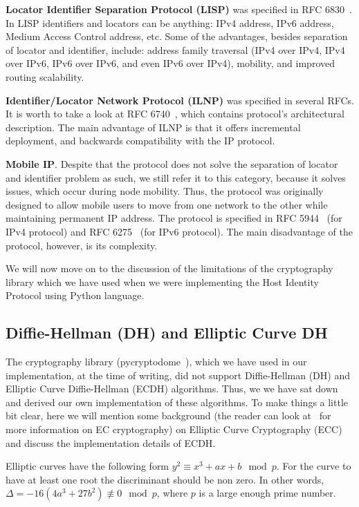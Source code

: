 {\bf Locator Identifier Separation Protocol (LISP)} was specified in RFC 6830~\cite{rfc6830}.
In LISP identifiers and locators can be anything: IPv4 address, IPv6 address, Medium
Access Control address, etc. Some of the advantages, besides separation of locator and
identifier, include: address family traversal (IPv4 over IPv4, IPv4 over IPv6, IPv6 over IPv6,
and even IPv6 over IPv4), mobility, and improved routing scalability.

{\bf Identifier/Locator Network Protocol (ILNP)} was specified in several RFCs. 
It is worth to take a look at RFC 6740~\cite{rfc6740}, which contains
protocol's architectural description. The main advantage of ILNP is that 
it offers incremental deployment, and backwards compatibility with the IP 
protocol. 

{\bf Mobile IP}. Despite that the protocol does not solve
the separation of locator and identifier problem as such, we still
refer it to this category, because it solves issues, which occur
during node mobility. Thus, the protocol was originally designed 
to allow mobile users to move from one network to the other while 
maintaining permanent IP address. The protocol is specified
in RFC 5944~\cite{rfc5944} (for IPv4 protocol) and RFC 6275~\cite{rfc6275} 
(for IPv6 protocol). The main disadvantage of the protocol, however,
is its complexity.

We will now move on to the discussion of the limitations of the cryptography library
which we have used when we were implementing the Host Identity Protocol
using Python language.

\subsection{Diffie-Hellman (DH) and Elliptic Curve DH}

The cryptography library (pycryptodome~\cite{crypto}), which we have used in our 
implementation, at the time of writing, did not support 
Diffie-Hellman (DH) and Elliptic Curve Diffie-Hellman (ECDH) algorithms. Thus, we
we have sat down and derived our own implementation of these
algorithms. To make things a little bit clear, here we will mention 
some background (the reader can look at~\cite{stinson} for more information on 
EC cryptography) on Elliptic Curve Cryptography (ECC)
and discuss the implementation details of ECDH.

Elliptic curves have the following form $y^2 \equiv x^3+ax+b \mod p$. For the 
curve to have at least one root the discriminant should be non 
zero. In other words, $\Delta = -16(4a^3+27b^2) \not\equiv 0 \mod p$,
where $p$ is a large enough prime number.

